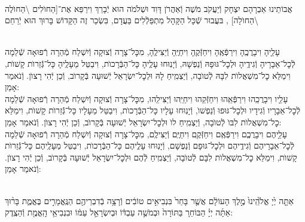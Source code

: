 \documentclass[twoside, openany, parskip=half, 11pt]{book}
\begin{document}
\begin{sometimes}
\\
אֲבוֹתֵינוּ אַבְרָהָם יִצְחָק וְֿיַעֲקֹב מֹשֶׁה וְֿאַהֲרֹן דָּוִד וּשְׁלֹמֹה הוּא יְֿבָרֵךְ וִירַפֵּא אֶת־[הַחוׂלִים \textbackslash הַחוׂלֶה \textbackslash הַחוׂלָה]
,
בּעֲבוּר שְֿׁכָּל הַקָּהָל מִתְפַּלְֿלִים בַּעֲדָם, בִּשְׂכַר זֶה
הַקָּדוֹשׁ בָּרוּךְ הוּא יְֿרַחֵם
\setcolumnwidth{1.4in,1.4in,1.4in}
\begin{paracol}{3}
\\
עָלֵָיהָ וִיבָרֲכֶֽהָ וִירַפְּֿאֶֽהָ וִיחַזְּֿקֶֽהָ וִיחַיֶּֽהָ וְֿיַצִּילֶֽהָ, מִכׇּל־צָרָה וְֿצוּקָה וְֿיִשְׁלַח מְֿהֵרָה רְֿפוּאָה שְֿׁלֵמָה לְֿכׇל־אֵבָרָיהָ וְֿגִידֶֽיהָ וּלְכׇל־גּוּפָהּ וְֿנַפְשָׁהּ, וְֿיָנֽוּחוּ עָלְֶיהָ כָּל־הַבְּֿרָכוׂת, וִיבַטֵּל מֵעָלֶֽיהָ כָּל־גְּֿֿזֵרוׂת קָשׁוׂת, וִימַלֵּא כׇל־מִשְׁאֲלוׂת לִבָּהּ לְֿטוׂבָה, וְֿיַצְמִֽיחַ לָהּ וּלְכׇל־יִשְׂרָאֵל יְֿשׁוּעָה בְּֿקָרוׂב, וְֿכֵן יְֿהִי רָצוׂן. וְֿנֹאמַר אָמֵן:
\switchcolumn
{}\\
עָלֵָיו וִיבָרֲכֵֽהוּ וִירַפְּֿאֵֽהוּ וִיחַזְּֿקֵהוּ וִיחַיֵּֽהוּ וְֿיַצִּילֵֽהוּ, מִכׇּל־צָרָה וְֿצוּקָה וְֿיִשְׁלַח מְֿהֵרָה רְֿפוּאָה שְֿׁלֵמָה לְֿכׇל־אֵבָרָיו וְֿגִידָיו וּלְכׇל־גּוּפוּ וְֿנַפְשׁוׂ, וְֿיָנֽוּחוּ עָלָיו כָּל־הַבְּֿרָכוׂת, וִיבַטֵּל מֵעָלָיו כָּל־גְּֿֿזֵרוׂת קָשׁוׂת, וִימַלֵּא כׇל־מִשְׁאֲלוׂת לִבּוׂ לְֿטוׂבָה, וְֿיַצְמִֽיחַ לוׂ וּלְכׇל־יִשְׂרָאֵל יְֿשׁוּעָה בְּֿקָרוׂב, וְֿכֵן יְֿהִי רָצוׂן. וְֿנֹאמַר אָמֵן:
\switchcolumn
{}\\
עָלֵָיהֶם וִיבָרֲכְֶם וִירַפְּֿאֶֽם וִיחַזְּֿקֶֽם וִיחַיֶּֽם וְֿיַצִּילֶֽם, מִכׇּל־צָרָה וְֿצוּקָה וְֿיִשְׁלַח מְֿהֵרָה רְֿפוּאָה שְֿׁלֵמָה לְֿכׇל־אֵבָרָיהֶם וְֿגִידֶֽיהֶם וּלְכׇל־גּוּפָם וְֿנַפְשָׁם, וְֿיָנֽוּחוּ עָלְֶיהֶם כָּל־הַבְּֿרָכוׂת, וִיבַטֵּל מֵעָלֶֽיהֶם כָּל־גְּֿֿזֵרוׂת קָשׁוׂת, וִימַלֵּא כׇל־מִשְׁאֲלוׂת לִבָּם לְֿטוׂבָה, וְֿיַצְמִֽיחַ לְֿהֶם וּלְכׇל־יִשְׂרָאֵל יְֿשׁוּעָה בְּֿקָרוׂב, וְֿכֵן יְֿהִי רָצוׂן. וְֿנֹאמַר אָמֵן:
\end{paracol}

\end{sometimes}

\halfkaddish

\hagbaha

\galila


\\
אַתָּ֤ה יְ֙יָ אֱלֹ֙הֵֽינוּ֙ מֶ֣לֶךְ הָעוֹלָ֔ם אֲשֶׁ֤ר בָּחַר֙ בִּנְבִיאִ֣ים טוֹבִ֔ים וְֿרָצָ֥ה בְֿדִבְרֵיהֶ֖ם הַנֶּֽאֱמָרִ֣ים בֶּאֱמֶ֑ת בָּר֨וּךְ אַתָּ֜ה יְיָ֗ הַבּוֹחֵר֚ בַּתּוֹרָה֙ וּבְמֹשֶׁ֣ה עַבְדּ֔וֹ וּבְיִשְׂרָאֵ֣ל עַמּ֔וֹ וּבִנְבִיאֵ֥י הָֽאֱמֶ֖ת וְֿהַצֶֽדֶק:
\end{document}
